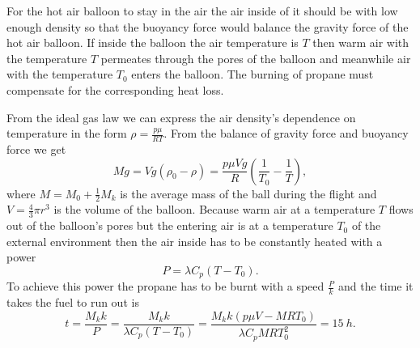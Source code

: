 \hinteng
For the hot air balloon to stay in the air the air inside of it should be with low enough density so that the buoyancy force would balance the gravity force of the hot air balloon. If inside the balloon the air temperature is $T$ then warm air with the temperature $T$ permeates through the pores of the balloon and meanwhile air with the temperature $T_0$ enters the balloon. The burning of propane must compensate for the corresponding heat loss.

\solueng
From the ideal gas law we can express the air density’s dependence on temperature in the form $\rho = \frac{p \mu}{R T}$. From the balance of gravity force and buoyancy force we get
\[
M g = V g (\rho_0 - \rho) = \frac{p \mu V g}{R} (\frac{1}{T_0} - \frac{1}{T}),
\] 
where $M = M_0 + \frac{1}{2} M_k$ is the average mass of the ball during the flight and $V = \frac{4}{3} \pi r^3$ is the volume of the balloon. Because warm air at a temperature $T$ flows out of the balloon’s pores but the entering air is at a temperature $T_0$ of the external environment then the air inside has to be constantly heated with a power
\[
P = \lambda C_p (T - T_0).
\] 
To achieve this power the propane has to be burnt with a speed $\frac{P}{k}$ and the time it takes the fuel to run out is
\[
t = \frac{M_k k}{P} = \frac{M_k k}{\lambda C_p (T - T_0)} = \frac{M_k k (p \mu V - M R T_0)}{\lambda C_p M R T_0^2} = \SI{15}{h}.
\]
\probend